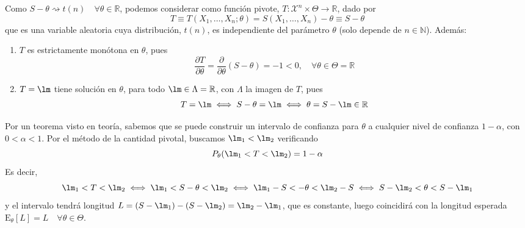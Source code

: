 \documentclass[12pt]{article}
\newcommand{\E}{\mathrm{E}}
\newcommand{\R}{\mathbb{R}}
\newcommand{\X}{\mathcal{X}}
\newcommand{\N}{\mathbb{N}}
\begin{document}
\begin{ejercicio}[1.85 puntos]
\begin{enumerate}[label=\alph*)]
            Como $S-\theta\rightsquigarrow t(n)\quad \forall \theta \in \mathbb{R}$, podemos considerar como función pivote, 
            $T : \X^n \times \Theta \to \R$, dado por 
            $$T \equiv T(X_1, \ldots, X_n; \theta) = S(X_1, \ldots, X_n) - \theta \equiv S - \theta$$ que es
            una variable aleatoria cuya distribución, $t(n)$, es independiente del parámetro $\theta$ (solo depende de $n \in \N$).
            Además:
            \begin{enumerate}
                \item $T$ es estrictamente monótona en $\theta$, pues
                $$\dfrac{\partial T}{\partial \theta} = \dfrac{\partial}{\partial \theta} (S - \theta) = - 1 < 0, \quad \forall \theta \in \Theta = \R$$
                \item $T = \lm$ tiene solución en $\theta$, para todo $\lm \in \Lambda = \R$, con $\Lambda$ la imagen de $T$, pues
                $$T = \lm \iff S - \theta = \lm \iff \theta = S - \lm \in \R$$ 
            \end{enumerate}
            Por un teorema visto en teoría, sabemos que se puede construir un intervalo de confianza para $\theta$ a cualquier nivel
            de confianza $1-\alpha$, con $0 < \alpha < 1$. Por el método de la cantidad pivotal, buscamos $\lm_1 < \lm_2$ 
            verificando $$P_\theta(\lm_1 < T < \lm_2) = 1 - \alpha$$
            Es decir,
            $$\lm_1 < T < \lm_2 \iff \lm_1 < S - \theta < \lm_2 \iff \lm_1 - S < - \theta < \lm_2 - S \iff
            S - \lm_2 < \theta < S - \lm_1$$
            y el intervalo tendrá longitud $L = (S-\lm_1) - (S - \lm_2) = \lm_2 - \lm_1$, que es constante, luego coincidirá 
            con la longitud esperada $\E_\theta[L] = L \quad \forall \theta \in \Theta$. \\
            

\end{enumerate}
\end{ejercicio}
\end{document}
